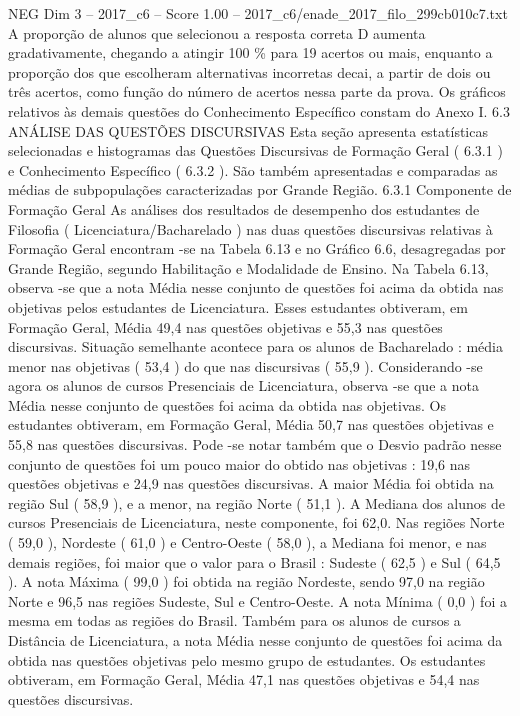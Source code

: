 \begin{textsample}{NEG Dim 3 – 2017\_c6 – Score 1.00 – 2017\_c6/enade\_2017\_filo\_299cb010c7.txt}
A proporção de alunos que selecionou a resposta correta D aumenta gradativamente, chegando a atingir 100 \% para 19 acertos ou mais, enquanto a proporção dos que escolheram alternativas incorretas decai, a partir de dois ou três acertos, como função do número de acertos nessa parte da prova.
Os gráficos relativos às demais questões do Conhecimento Específico constam do Anexo I. 6.3 ANÁLISE DAS QUESTÕES DISCURSIVAS Esta seção apresenta estatísticas selecionadas e histogramas das Questões Discursivas de Formação Geral ( 6.3.1 ) e Conhecimento Específico ( 6.3.2 ).
São também apresentadas e comparadas as médias de subpopulações caracterizadas por Grande Região. 6.3.1 Componente de Formação Geral As análises dos resultados de desempenho dos estudantes de Filosofia ( Licenciatura/Bacharelado ) nas duas questões discursivas relativas à Formação Geral encontram -se na Tabela 6.13 e no Gráfico 6.6, desagregadas por Grande Região, segundo Habilitação e Modalidade de Ensino.
Na Tabela 6.13, observa -se que a nota Média nesse conjunto de questões foi acima da obtida nas objetivas pelos estudantes de Licenciatura.
Esses estudantes obtiveram, em Formação Geral, Média 49,4 nas questões objetivas e 55,3 nas questões discursivas.
Situação semelhante acontece para os alunos de Bacharelado : média menor nas objetivas ( 53,4 ) do que nas discursivas ( 55,9 ).
Considerando -se agora os alunos de cursos Presenciais de Licenciatura, observa -se que a nota Média nesse conjunto de questões foi acima da obtida nas objetivas.
Os estudantes obtiveram, em Formação Geral, Média 50,7 nas questões objetivas e 55,8 nas questões discursivas.
Pode -se notar também que o Desvio padrão nesse conjunto de questões foi um pouco maior do obtido nas objetivas : 19,6 nas questões objetivas e 24,9 nas questões discursivas.
A maior Média foi obtida na região Sul ( 58,9 ), e a menor, na região Norte ( 51,1 ).
A Mediana dos alunos de cursos Presenciais de Licenciatura, neste componente, foi 62,0.
Nas regiões Norte ( 59,0 ), Nordeste ( 61,0 ) e Centro-Oeste ( 58,0 ), a Mediana foi menor, e nas demais regiões, foi maior que o valor para o Brasil : Sudeste ( 62,5 ) e Sul ( 64,5 ).
A nota Máxima ( 99,0 ) foi obtida na região Nordeste, sendo 97,0 na região Norte e 96,5 nas regiões Sudeste, Sul e Centro-Oeste.
A nota Mínima ( 0,0 ) foi a mesma em todas as regiões do Brasil.
Também para os alunos de cursos a Distância de Licenciatura, a nota Média nesse conjunto de questões foi acima da obtida nas questões objetivas pelo mesmo grupo de estudantes.
Os estudantes obtiveram, em Formação Geral, Média 47,1 nas questões objetivas e 54,4 nas questões discursivas.

\end{textsample}
